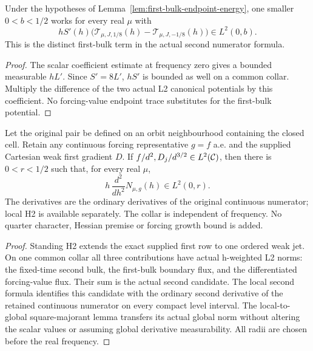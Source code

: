 \begin{lemma}
\label{lem:weighted-first-bulk-boundary}
\leanok
Under the hypotheses of Lemma~\ref{lem:first-bulk-endpoint-energy},
one smaller $0<b<1/2$ works for every real $\mu$ with
\[
 hS'(h)\bigl(\mathcal T_{\mu,J,1/8}(h)
                 -\mathcal T_{\mu,J,-1/8}(h)\bigr)\in L^2(0,b).
\]
This is the distinct first-bulk term in the actual second numerator formula.
\end{lemma}

\begin{proof}
\leanok
The scalar coefficient estimate at frequency zero gives a bounded measurable
$hL'$. Since $S'=8L'$, $hS'$ is bounded as well on a common collar.
Multiply the difference of the two actual L2 canonical potentials by this
coefficient. No forcing-value endpoint trace substitutes for the first-bulk
potential.
\end{proof}

\begin{lemma}
\label{lem:weighted-numerator-second-norm}
\leanok
Let the original pair be defined on an orbit neighbourhood containing the
closed cell. Retain any continuous forcing representative $g=f$ a.e. and the
supplied Cartesian weak first gradient $D$.
If $f/d^2,D_j/d^{3/2}\in L^2(\mathcal{C})$, then there is $0<r<1/2$ such that,
for every real $\mu$,
\[
 h\,\frac{d^2}{dh^2}N_{\mu,g}(h)\in L^2(0,r).
\]
The derivatives are the ordinary derivatives of the original continuous
numerator; local H2 is available separately. The collar is independent of
frequency. No quarter character, Hessian premise or forcing growth bound is added.
\end{lemma}

\begin{proof}
\leanok
Standing H2 extends the exact supplied first row to one ordered weak jet.
On one common collar all three contributions have actual h-weighted L2 norms:
the fixed-time second bulk, the first-bulk boundary flux, and the differentiated
forcing-value flux. Their sum is the actual second candidate.
The local second formula identifies this candidate with the ordinary second
derivative of the retained continuous numerator on every compact level interval.
The local-to-global square-majorant lemma transfers its actual global norm
without altering the scalar values or assuming global derivative measurability.
All radii are chosen before the real frequency.
\end{proof}

